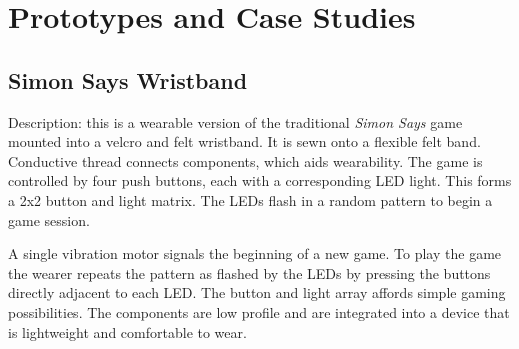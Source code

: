 \documentclass{chi-ext}
\begin{document}
\section{Prototypes and Case Studies}

\subsection{Simon Says Wristband}
Description: this is a wearable version of the traditional \emph{Simon Says} game mounted into a velcro and felt wristband.  It is sewn onto a flexible felt band. Conductive thread connects components, which aids wearability. The game is controlled by four push buttons, each with a corresponding LED light. This forms a 2x2 button and light matrix. The LEDs flash in a random pattern to begin a game session. 

A single vibration motor signals the beginning of a new game. To play the game the wearer repeats the pattern as flashed by the LEDs by pressing the buttons directly adjacent to each LED. The button and light array affords simple gaming possibilities. The components are low profile and are integrated into a device that is lightweight and comfortable to wear. 

\end{document}
